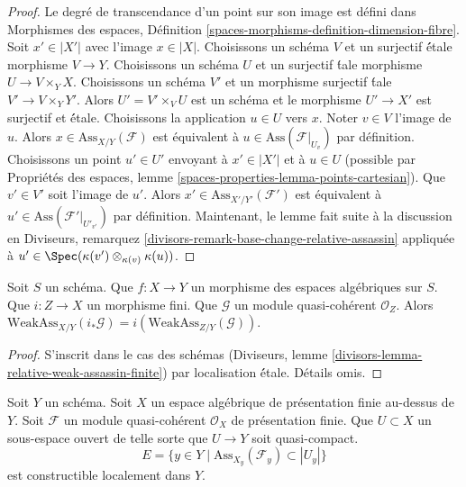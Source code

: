 \begin{proof}
Le degré de transcendance d'un point sur son image est défini dans
Morphismes des espaces, Définition
\ref{spaces-morphisms-definition-dimension-fibre}.
Soit $x' \in |X'|$ avec l'image $x \in |X|$.
Choisissons un schéma $V$ et un surjectif \'étale morphisme $V \to Y$.
Choisissons un schéma $U$ et un surjectif
\'tale morphisme $U \to V \times_Y X$. Choisissons un schéma $V'$
et un morphisme surjectif \'tale $V' \to V \times_Y Y'$.
Alors $U' = V' \times_V U$ est un schéma et le morphisme
$U' \to X'$ est surjectif et \'étale.
Choisissons la application $u \in U$ vers $x$.
Noter $v \in V$ l'image de $u$.
Alors $x \in \text{Ass}_{X/Y}(\mathcal{F})$ est
équivalent à $u \in \text{Ass}(\mathcal{F}|_{U_v})$
par définition. Choisissons un point $u' \in U'$ envoyant
à $x' \in |X'|$ et à $u \in U$ (possible par
Propriétés des espaces, lemme \ref{spaces-properties-lemma-points-cartesian}).
Que $v' \in V'$ soit l'image de $u'$.
Alors $x' \in \text{Ass}_{X'/Y'}(\mathcal{F}')$ est
équivalent à $u' \in \text{Ass}(\mathcal{F}'|_{U'_{v'}})$
par définition.
Maintenant, le lemme fait suite à la discussion en
Diviseurs, remarquez \ref{divisors-remark-base-change-relative-assassin}
appliquée à $u' \in \Spec(\kappa(v') \otimes_{\kappa(v)} \kappa(u))$.
\end{proof}

\begin{lemma}
\label{lemma-relative-weak-assassin-finite}
Soit $S$ un schéma.
Que $f : X \to Y$ un morphisme des espaces algébriques sur $S$.
Que $i : Z \to X$ un morphisme fini.
Que $\mathcal{G}$ un module quasi-cohérent $\mathcal{O}_Z$.
Alors $\text{WeakAss}_{X/Y}(i_*\mathcal{G}) =
i(\text{WeakAss}_{Z/Y}(\mathcal{G}))$.
\end{lemma}

\begin{proof}
S'inscrit dans le cas des schémas
(Diviseurs, lemme \ref{divisors-lemma-relative-weak-assassin-finite})
par localisation \'étale. Détails omis.
\end{proof}

\begin{lemma}
\label{lemma-relative-assassin-constructible}
Soit $Y$ un schéma. Soit $X$ un espace algébrique de présentation finie
au-dessus de $Y$. Soit $\mathcal{F}$ un module quasi-cohérent $\mathcal{O}_X$
de présentation finie. Que $U \subset X$ un sous-espace ouvert
de telle sorte que $U \to Y$ soit quasi-compact.
$$
E = \{y \in Y \mid \text{Ass}_{X_y}(\mathcal{F}_y) \subset |U_y|\}
$$
est constructible localement dans $Y$.
\end{lemma}

